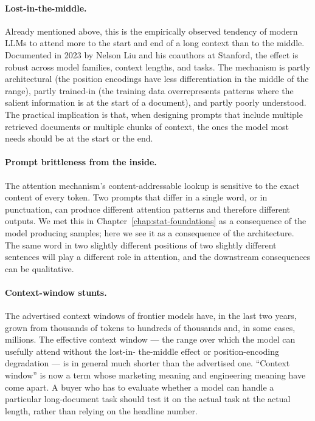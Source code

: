 \paragraph{Lost-in-the-middle.} Already mentioned above, this
is the empirically observed tendency of modern LLMs to attend
more to the start and end of a long context than to the middle.
Documented in 2023 by Nelson Liu and his coauthors at Stanford,
the effect is robust across model families, context lengths,
and tasks. The mechanism is partly architectural (the position
encodings have less differentiation in the middle of the
range), partly trained-in (the training data overrepresents
patterns where the salient information is at the start of a
document), and partly poorly understood. The practical
implication is that, when designing prompts that include
multiple retrieved documents or multiple chunks of context, the
ones the model most needs should be at the start or the end.

\paragraph{Prompt brittleness from the inside.} The attention
mechanism's content-addressable lookup is sensitive to the exact
content of every token. Two prompts that differ in a single
word, or in punctuation, can produce different attention
patterns and therefore different outputs. We met this in
Chapter~\ref{chap:stat-foundations} as a consequence of the model producing samples; here
we see it as a consequence of the architecture. The same word
in two slightly different positions of two slightly different
sentences will play a different role in attention, and the
downstream consequences can be qualitative.

\paragraph{Context-window stunts.} The advertised context
windows of frontier models have, in the last two years, grown
from thousands of tokens to hundreds of thousands and, in some
cases, millions. The effective context window --- the range
over which the model can usefully attend without the lost-in-
the-middle effect or position-encoding degradation --- is in
general much shorter than the advertised one. ``Context window''
is now a term whose marketing meaning and engineering meaning
have come apart. A buyer who has to evaluate whether a model
can handle a particular long-document task should test it on
the actual task at the actual length, rather than relying on
the headline number.

